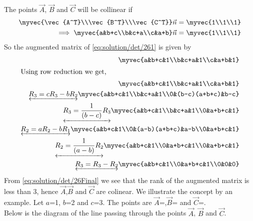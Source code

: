 The points $\vec{A}$, $\vec{B}$ and $\vec{C}$ will be collinear if
\begin{align}
\myvec{\vec{A^T}\\\vec{B^T}\\\vec{C^T}}\vec{n}=\myvec{1\\1\\1}\\
\implies\myvec{a&b+c\\b&c+a\\c&a+b}\vec{n}=\myvec{1\\1\\1}\label{eq:solution/det/261}
\end{align}
So the augmented matrix of \eqref{eq:solution/det/261} is given by
\begin{align}
\myvec{a&b+c&1\\b&c+a&1\\c&a+b&1}\\
\intertext{Using row reduction we get,}
\myvec{a&b+c&1\\b&c+a&1\\c&a+b&1}\\\underleftrightarrow{R_3=cR_3-bR_2}\myvec{a&b+c&1\\b&c+a&1\\0&(b-c)(a+b+c)&b-c}\\
\underleftrightarrow{R_3=\frac{1}{(b-c)}R_3}\myvec{a&b+c&1\\b&c+a&1\\0&a+b+c&1}\\
\underleftrightarrow{R_2=aR_2-bR_1}\myvec{a&b+c&1\\0&(a-b)(a+b+c)&a-b\\0&a+b+c&1}\\
\underleftrightarrow{R_2=\frac{1}{(a-b)}R_2}\myvec{a&b+c&1\\0&a+b+c&1\\0&a+b+c&1}\\
\underleftrightarrow{R_3=R_3-R_2}\myvec{a&b+c&1\\0&a+b+c&1\\0&0&0}\\
\label{eq:solution/det/26Final}
\end{align}
From \eqref{eq:solution/det/26Final} we see that the rank of the augmented matrix is less than 3, hence $\vec{A}$,$\vec{B}$ and $\vec{C}$ are colinear.
We illustrate the concept by an example. Let $a$=1, $b$=2 and $c$=3. The points are $\vec{A}$=,$\vec{B}$= and $\vec{C}$=.\\ 
Below is the diagram of the line passing through the points $\vec{A}$, $\vec{B}$ and $\vec{C}$.
%
